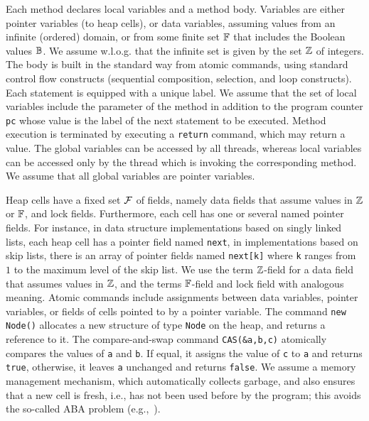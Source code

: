 %
Each method declares local variables
  and a method body.
%
Variables are either pointer variables
(to heap cells), 
or data variables, assuming values from an infinite (ordered)
domain,
or from some finite set $\mathbb{F}$ that includes the Boolean values $\mathbb{B}$.
%
We assume w.l.o.g. that the infinite set is given by the set 
${\mathbb Z}$ of integers.
%
The body is built in the standard way
from atomic commands, using standard control
flow constructs (sequential composition, selection, and loop constructs).
%
Each statement is equipped with a unique label.
%
We assume that the set of local variables include the parameter of the method
in addition to the program counter {\tt pc} whose value is the label of the next
statement to be executed.
%
Method execution is terminated by executing a {\tt return} command,
which may return a value.
The global variables can be
accessed by all threads, whereas local variables can be accessed only
by the thread which is invoking the corresponding method.
%
We assume that all global variables are pointer variables.

%
Heap cells have a fixed set $\mathcal{F}$ of fields, namely
data fields that assume values in
${\mathbb Z}$ or $\mathbb{F}$, and lock fields.
Furthermore, each cell has one or several named pointer fields.
For instance, in data structure implementations based on singly linked lists,
each heap cell has a pointer field named {\tt next}, in implementations
based on skip lists, there is an array of pointer fields named
{\tt next[k]} where {\tt k} ranges from $1$ to the maximum level of the
skip list.
We use the term ${\mathbb Z}$-field for a data field that
assumes values in ${\mathbb Z}$, and the terms $\mathbb{F}$-field and lock field
with analogous meaning.
Atomic commands include assignments between data variables, 
pointer variables, or fields of cells pointed to by a pointer variable.
%
The command {\tt new Node()} allocates a new structure of type
{\tt Node} on the heap, and returns a reference to it.
%
The compare-and-swap command {\tt CAS(\&a,b,c)} atomically
compares the values of {\tt a} and {\tt b}.
If  equal, it assigns the value of
{\tt c} to {\tt a}  and returns {\tt true}, 
otherwise, it leaves {\tt a} unchanged and returns {\tt false}. 
%
We assume a memory management mechanism, which automatically collects
garbage, and also ensures that a new cell is fresh, i.e., has
not been used before by the program; this avoids the so-called
ABA problem (e.g.,~\cite{MS:QueueAlgorithms}).


